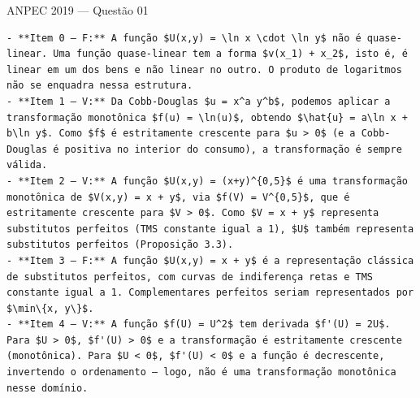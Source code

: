 \documentclass[11pt,twoside,openright]{book}
\begin{document}
\begin{infobox}{ANPEC 2019 — Questão 01}
\begin{verbatim}
- **Item 0 — F:** A função $U(x,y) = \ln x \cdot \ln y$ não é quase-linear. Uma função quase-linear tem a forma $v(x_1) + x_2$, isto é, é linear em um dos bens e não linear no outro. O produto de logaritmos não se enquadra nessa estrutura.
- **Item 1 — V:** Da Cobb-Douglas $u = x^a y^b$, podemos aplicar a transformação monotônica $f(u) = \ln(u)$, obtendo $\hat{u} = a\ln x + b\ln y$. Como $f$ é estritamente crescente para $u > 0$ (e a Cobb-Douglas é positiva no interior do consumo), a transformação é sempre válida.
- **Item 2 — V:** A função $U(x,y) = (x+y)^{0,5}$ é uma transformação monotônica de $V(x,y) = x + y$, via $f(V) = V^{0,5}$, que é estritamente crescente para $V > 0$. Como $V = x + y$ representa substitutos perfeitos (TMS constante igual a 1), $U$ também representa substitutos perfeitos (Proposição 3.3).
- **Item 3 — F:** A função $U(x,y) = x + y$ é a representação clássica de substitutos perfeitos, com curvas de indiferença retas e TMS constante igual a 1. Complementares perfeitos seriam representados por $\min\{x, y\}$.
- **Item 4 — V:** A função $f(U) = U^2$ tem derivada $f'(U) = 2U$. Para $U > 0$, $f'(U) > 0$ e a transformação é estritamente crescente (monotônica). Para $U < 0$, $f'(U) < 0$ e a função é decrescente, invertendo o ordenamento — logo, não é uma transformação monotônica nesse domínio.
\end{verbatim}

\end{infobox}
\end{document}
